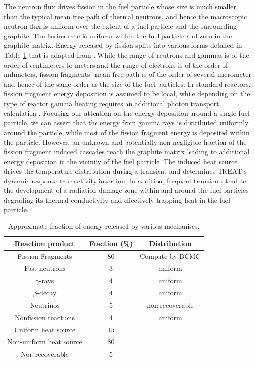 \documentclass{anstrans}
\begin{document}
The neutron flux drives fission in the fuel particle whose size is much smaller than the typical mean free path of thermal neutrons, and hence the macroscopic neutron flux is uniform over the extent of a fuel particle and the surrounding graphite. The fission rate is uniform within the fuel particle and zero in the graphite matrix. Energy released by fission splits into various forms detailed in Table \ref{tab:energy_release} that is adapted from \cite{DH}. While the range of neutrons and gammas is of the order of centimeters to meters and the range of electrons is of the order of milimeters, fission fragments' mean free path is of the order of several micrometer and hence of the same order as the size of the fuel particles. In standard reactors, fission fragment energy deposition is assumed to be local, while depending on the type of reactor gamma heating requires an additional photon transport calculation \cite{GammaHeating}. Focusing our attention on the energy deposition around a single fuel particle, we can assert that the energy from gamma rays is distributed uniformly around the particle, while most of the fission fragment energy is deposited within the particle. However, an unknown and potentially non-negligible fraction of the fission fragment induced cascades reach the graphite matrix leading to additional energy deposition in the vicinity of the fuel particle. The induced heat source drives the temperature distribution during a transient and determines TREAT's dynamic response to reactivity insertion. In addition, frequent transients lead to the development of a radiation damage zone within and around the fuel particles degrading its thermal conductivity and effectively trapping heat in the fuel particle.

\begin{table}[t]
\centering
\caption{Approximate fraction of energy released by various mechaniscs. \label{tab:energy_release}}
\begin{tabular}{ccc}
\toprule
Reaction product & Fraction (\%) & Distribution\\
\midrule
Fission Fragments & 80 & Compute by BCMC\\
Fast neutrons & 3& uniform\\
$\gamma$-rays & 4 & uniform\\
$\beta$-decay & 4 & uniform \\
Neutrinos & 5& non-recoverable\\
Nonfission reactions & 4 & uniform\\
\midrule
Uniform heat source & 15&\\
Non-uniform heat source &80 &\\
Non-recoverable & 5&\\
\bottomrule
\end{tabular}
\end{table}
\end{document}
